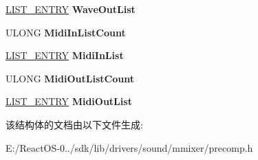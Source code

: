 \begin{DoxyCompactItemize}
\hyperlink{struct___l_i_s_t___e_n_t_r_y}{L\+I\+S\+T\+\_\+\+E\+N\+T\+RY} {\bfseries Wave\+Out\+List}
\item 
\mbox{\label{struct_m_i_x_e_r___l_i_s_t_a10d941ead3ce595c5db743997eb25ffa}} 
U\+L\+O\+NG {\bfseries Midi\+In\+List\+Count}
\item 
\mbox{\label{struct_m_i_x_e_r___l_i_s_t_a249d1cef8e170a3b813ca0a17f2e6016}} 
\hyperlink{struct___l_i_s_t___e_n_t_r_y}{L\+I\+S\+T\+\_\+\+E\+N\+T\+RY} {\bfseries Midi\+In\+List}
\item 
\mbox{\label{struct_m_i_x_e_r___l_i_s_t_a8424b83a7721c0682a6bde27d56b203a}} 
U\+L\+O\+NG {\bfseries Midi\+Out\+List\+Count}
\item 
\mbox{\label{struct_m_i_x_e_r___l_i_s_t_a1e6e8fdc816967c7113d28be939665c1}} 
\hyperlink{struct___l_i_s_t___e_n_t_r_y}{L\+I\+S\+T\+\_\+\+E\+N\+T\+RY} {\bfseries Midi\+Out\+List}
\end{DoxyCompactItemize}


该结构体的文档由以下文件生成\+:\begin{DoxyCompactItemize}
\item 
E\+:/\+React\+O\+S-\/0../sdk/lib/drivers/sound/mmixer/precomp.\+h\end{DoxyCompactItemize}
